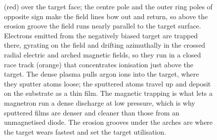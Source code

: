 \begin{figure}[htbp]
{(red) over the target face; the centre pole and the outer ring poles of
opposite sign make the field lines bow out and return, so above the erosion
groove the field runs nearly parallel to the target surface. Electrons emitted
from the negatively biased target are trapped there, gyrating on the field and
drifting azimuthally in the crossed radial electric and arched magnetic fields,
so they run in a closed race track (orange) that concentrates ionisation just
above the target. The dense plasma pulls argon ions into the target, where they
sputter atoms loose; the sputtered atoms travel up and deposit on the substrate
as a thin film. The magnetic trapping is what lets a magnetron run a dense
discharge at low pressure, which is why sputtered films are denser and cleaner
than those from an unmagnetised diode. The erosion grooves under the arches are
where the target wears fastest and set the target utilisation.}
\label{fig:vol04ch13:magnetron-sputter}
\end{figure}
